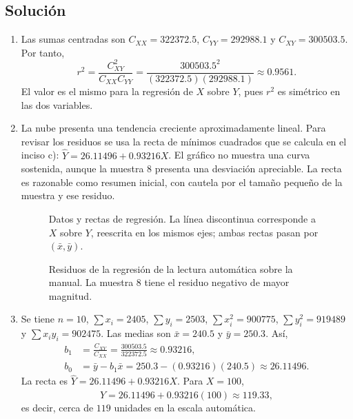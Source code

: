 \subsection*{Solución}
\begin{enumerate}
    \item[\textbf{a)}] Las sumas centradas son $C_{XX}=322372.5$, $C_{YY}=292988.1$ y $C_{XY}=300503.5$. Por tanto,
    \[
    r^2=\frac{C_{XY}^2}{C_{XX}C_{YY}}
    =\frac{300503.5^2}{(322372.5)(292988.1)}\approx0.9561.
    \]
    El valor es el mismo para la regresión de $X$ sobre $Y$, pues $r^2$ es simétrico en las dos variables.

    \item[\textbf{b)}] La nube presenta una tendencia creciente aproximadamente lineal. Para revisar los residuos se usa la recta de mínimos cuadrados que se calcula en el inciso c): $\widehat Y=26.11496+0.93216X$. El gráfico no muestra una curva sostenida, aunque la muestra 8 presenta una desviación apreciable. La recta es razonable como resumen inicial, con cautela por el tamaño pequeño de la muestra y ese residuo.
    \begin{figure}[H]
    \centering
    
    \caption{Datos y rectas de regresión. La línea discontinua corresponde a $X$ sobre $Y$, reescrita en los mismos ejes; ambas rectas pasan por $(\bar x,\bar y)$.}
    \label{fig:clase5-metodos-ajustes}
    \end{figure}
    \begin{figure}[H]
    \centering
    
    \caption{Residuos de la regresión de la lectura automática sobre la manual. La muestra 8 tiene el residuo negativo de mayor magnitud.}
    \label{fig:clase5-metodos-residuos}
    \end{figure}

    \item[\textbf{c)}] Se tiene $n=10$, $\sum x_i=2405$, $\sum y_i=2503$, $\sum x_i^2=900775$, $\sum y_i^2=919489$ y $\sum x_iy_i=902475$. Las medias son $\bar x=240.5$ y $\bar y=250.3$. Así,
    \begin{align*}
    b_1&=\frac{C_{XY}}{C_{XX}}=\frac{300503.5}{322372.5}\approx0.93216,\\
    b_0&=\bar y-b_1\bar x=250.3-(0.93216)(240.5)\approx26.11496.
    \end{align*}
    La recta es $\widehat Y=26.11496+0.93216X$. Para $X=100$,
    \[
    \widehat Y=26.11496+0.93216(100)\approx119.33,
    \]
    es decir, cerca de $119$ unidades en la escala automática.


\end{enumerate}
